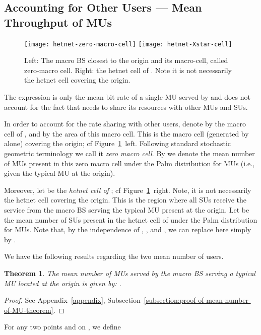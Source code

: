 \documentclass[10pt,journal]{IEEEtran}
\newtheorem{theorem}{Theorem}
\begin{document}
\subsection{Accounting for Other Users --- Mean Throughput of MUs} 
\begin{figure}[t!]
\begin{center}
\begin{minipage}{1\linewidth}
\begin{center}
\centerline{\texttt{[image: hetnet-zero-macro-cell]}
\hspace{0.03\linewidth}
\texttt{[image: hetnet-Xstar-cell]}}
\vspace{-2ex}
\caption[Zero macro cell and its zero hetnet subset]{Left: The  macro BS  closest to the origin and its macro-cell,
called zero-macro cell. Right: the hetnet cell of . Note it is not necessarily the hetnet cell covering the origin.
\label{fig:hetnet-zero-macro-cel}}
\end{center}
\end{minipage}
\end{center}
\end{figure}

The expression  is only the mean  bit-rate of a
single MU served by   and  does not account
for the fact that  needs to share its resources with other MUs
and SUs. 

In order to account for the rate sharing with other users, denote 
by   the macro cell of , and by  the area of this macro cell. This is the
macro cell (generated by  alone)  covering the origin; cf Figure~\ref{fig:hetnet-zero-macro-cel}~left. Following standard stochastic
geometric terminology we call it  {\em zero macro  cell}.
By 
we denote the mean number of MUs present in this zero macro cell 
under the Palm distribution for MUs (i.e., given the typical MU at
the origin).

Moreover, let   be the {\em hetnet cell of };
cf Figure~\ref{fig:hetnet-zero-macro-cel}~right.
Note, it is not necessarily the hetnet cell covering the origin. This is the region where all SUs receive the service from the 
macro BS  serving the typical MU present at the origin.
Let  be the mean number of SUs 
present in the  hetnet cell of   under the Palm distribution for
MUs. Note that, by the independence of 
, ,  and , 
we can replace  here simply by .
 
We have the following results regarding the two mean number of users.

\begin{theorem}\label{theorem:mean-number-of-MU-served-by-a-macro-BS}
 The mean number of MUs served by the macro BS serving a typical MU located at the origin is given by: 
 .
\end{theorem}
\begin{proof}
See Appendix~\ref{appendix}, 
Subsection~\ref{subsection:proof-of-mean-number-of-MU-theorem}. 
\end{proof}
For  any two points  and  on , we define 
\end{document}
